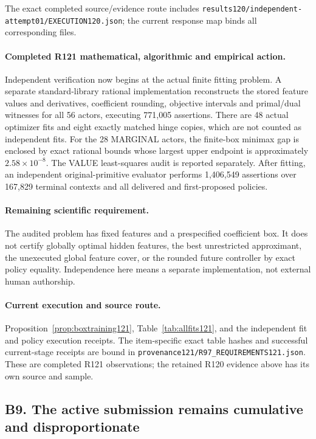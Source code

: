 The exact completed source/evidence route includes \nolinkurl{results120/independent-attempt01/EXECUTION120.json}; the current response map binds all corresponding files.

\paragraph{Completed R121 mathematical, algorithmic and empirical action.}
Independent verification now begins at the actual finite fitting problem. A separate standard-library rational implementation reconstructs the stored feature values and derivatives, coefficient rounding, objective intervals and primal/dual witnesses for all 56 actors, executing 771,005 assertions. There are 48 actual optimizer fits and eight exactly matched hinge copies, which are not counted as independent fits. For the 28 MARGINAL actors, the finite-box minimax gap is enclosed by exact rational bounds whose largest upper endpoint is approximately $2.58\times10^{-8}$. The VALUE least-squares audit is reported separately. After fitting, an independent original-primitive evaluator performs 1,406,549 assertions over 167,829 terminal contexts and all delivered and first-proposed policies.

\paragraph{Remaining scientific requirement.}
The audited problem has fixed features and a prespecified coefficient box. It does not certify globally optimal hidden features, the best unrestricted approximant, the unexecuted global feature cover, or the rounded future controller by exact policy equality. Independence here means a separate implementation, not external human authorship.

\paragraph{Current execution and source route.}
Proposition~\ref{prop:boxtraining121}, Table~\ref{tab:allfits121}, and the independent fit and policy execution receipts.
The item-specific exact table hashes and successful current-stage receipts are bound in \nolinkurl{provenance121/R97_REQUIREMENTS121.json}. These are completed R121 observations; the retained R120 evidence above has its own source and sample.

\subsection{B9. The active submission remains cumulative and disproportionate}
\label{response121:B9}

